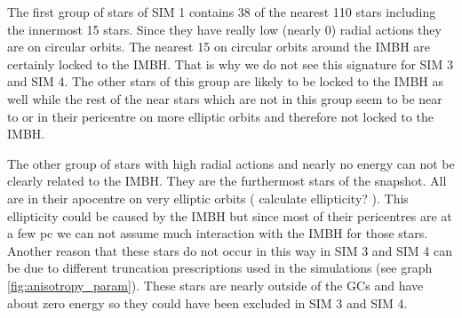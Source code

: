 \par The first group of stars of SIM 1 contains 38 of the nearest 110 stars including the innermost 15 stars. Since they have really low (nearly 0) radial actions they are on circular orbits. The nearest 15 on circular orbits around the \ac{IMBH} are certainly locked to the \ac{IMBH}. That is why we do not see this signature for SIM 3 and SIM 4. The other stars of this group are likely to be locked to the \ac{IMBH} as well while the rest of the near stars which are not in this group seem to be near to or in their pericentre on more elliptic orbits and therefore not locked to the \ac{IMBH}. 
\par The other group of stars with high radial actions and nearly no energy can not be clearly related to the \ac{IMBH}. They are the furthermost stars of the snapshot. All are in their apocentre on very elliptic orbits (\color{red} calculate ellipticity? \color{black}). This ellipticity could be caused by the \ac{IMBH} but since most of their pericentres are at a few pc we can not assume much interaction with the \ac{IMBH} for those stars. Another reason that these stars do not occur in this way in SIM 3 and SIM 4 can be due to different truncation prescriptions used in the simulations (see graph \ref{fig:anisotropy_param}). These stars are nearly outside of the \acp{GC} and have about zero energy so they could have been excluded in SIM 3 and SIM 4. 

